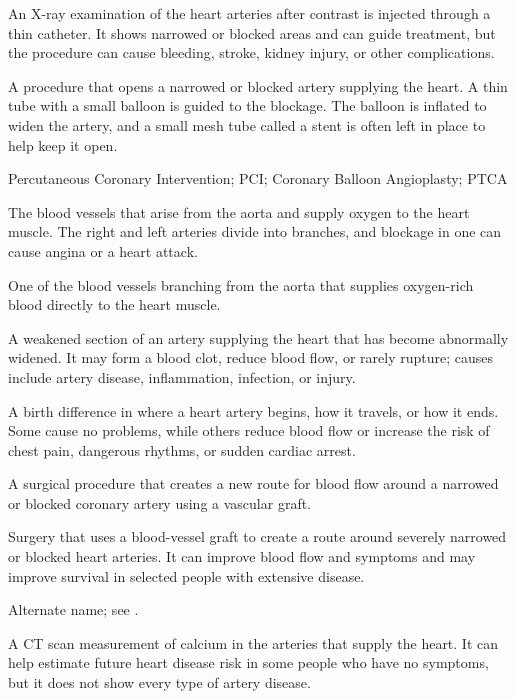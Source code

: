  An X-ray examination of the heart arteries after contrast is injected through a thin catheter. It shows narrowed or blocked areas and can guide treatment, but the procedure can cause bleeding, stroke, kidney injury, or other complications.

 A procedure that opens a narrowed or blocked artery supplying the heart. A thin tube with a small balloon is guided to the blockage. The balloon is inflated to widen the artery, and a small mesh tube called a stent is often left in place to help keep it open.

\synonyms
Percutaneous Coronary Intervention; PCI; Coronary Balloon Angioplasty; PTCA

 The blood vessels that arise from the aorta and supply oxygen to the heart muscle. The right and left arteries divide into branches, and blockage in one can cause angina or a heart attack.

 One of the blood vessels branching from the aorta that supplies oxygen-rich blood
directly to the heart muscle.

 A weakened section of an artery supplying the heart that has become abnormally widened. It may form a blood clot, reduce blood flow, or rarely rupture; causes include artery disease, inflammation, infection, or injury.

 A birth difference in where a heart artery begins, how it travels, or how it ends. Some cause no problems, while others reduce blood flow or increase the risk of chest pain, dangerous rhythms, or sudden cardiac arrest.

 A surgical procedure that creates a new route for blood flow around a narrowed or
blocked coronary artery using a vascular graft.

 Surgery that uses a blood-vessel graft to create a route around severely narrowed or blocked heart arteries. It can improve blood flow and symptoms and may improve survival in selected people with extensive disease.

 Alternate name; see .

 A CT scan measurement of calcium
in the arteries that supply the heart. It can help estimate future heart
disease risk in some people who have no symptoms, but it does not show every
type of artery disease.

